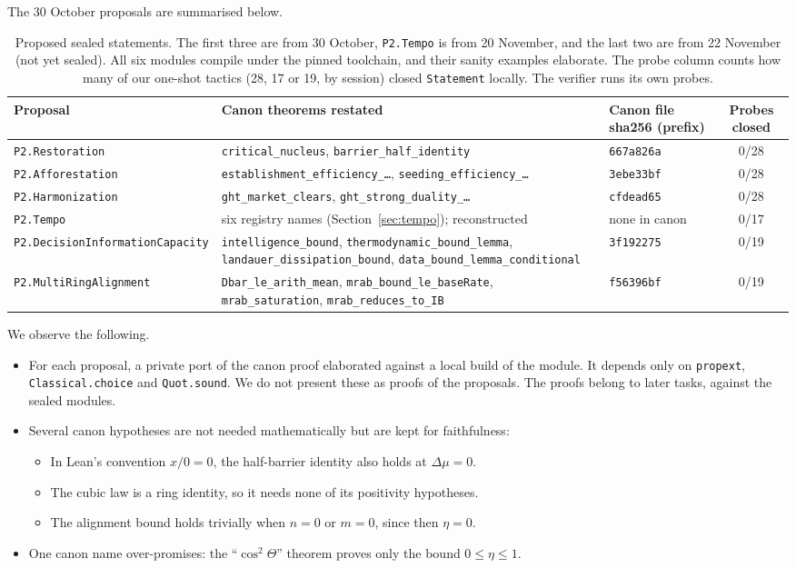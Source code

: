 \documentclass[11pt]{article}
\theoremstyle{definition}
\theoremstyle{remark}
\begin{document}
The 30 October proposals are summarised below.
\begin{table}[h]
\centering\small
\begin{tabular}{@{}p{}p{}lc@{}}
\toprule
Proposal & Canon theorems restated & Canon file sha256 (prefix) & Probes closed \\
\midrule
\texttt{P2.Restoration} & \texttt{critical\_nucleus}, \texttt{barrier\_half\_identity} & \texttt{667a826a} & 0/28 \\
\texttt{P2.Afforestation} & \texttt{establishment\_efficiency\_\ldots}, \texttt{seeding\_efficiency\_\ldots} & \texttt{3ebe33bf} & 0/28 \\
\texttt{P2.Harmonization} & \texttt{ght\_market\_clears}, \texttt{ght\_strong\_duality\_\ldots} & \texttt{cfdead65} & 0/28 \\
\texttt{P2.Tempo} & six registry names (Section~\ref{sec:tempo}); reconstructed & none in canon & 0/17 \\
\texttt{P2.Decision}\allowbreak\texttt{Information}\allowbreak\texttt{Capacity} & \texttt{intelligence\_bound}, \texttt{thermodynamic\_bound\_lemma}, \texttt{landauer\_dissipation\_bound}, \texttt{data\_bound\_lemma\_conditional} & \texttt{3f192275} & 0/19 \\
\texttt{P2.MultiRing}\allowbreak\texttt{Alignment} & \texttt{Dbar\_le\_arith\_mean}, \texttt{mrab\_bound\_le\_baseRate}, \texttt{mrab\_saturation}, \texttt{mrab\_reduces\_to\_IB} & \texttt{f56396bf} & 0/19 \\
\bottomrule
\end{tabular}
\caption{Proposed sealed statements. The first three are from 30 October, \texttt{P2.Tempo} is from 20 November, and the last two are from 22 November (not yet sealed). All six modules compile under the pinned toolchain, and their sanity examples elaborate.
The probe column counts how many of our one-shot tactics (28, 17 or 19, by session) closed \texttt{Statement} locally. The verifier runs its own probes.}
\end{table}
We observe the following.
\begin{itemize}
\item For each proposal, a private port of the canon proof elaborated against a local build of the module.
It depends only on \texttt{propext}, \texttt{Classical.choice} and \texttt{Quot.sound}.
We do not present these as proofs of the proposals. The proofs belong to later tasks, against the sealed modules.
\item Several canon hypotheses are not needed mathematically but are kept for faithfulness:
\begin{itemize}
\item In Lean's convention $x/0=0$, the half-barrier identity also holds at $\Delta\mu=0$.
\item The cubic law is a ring identity, so it needs none of its positivity hypotheses.
\item The alignment bound holds trivially when $n=0$ or $m=0$, since then $\eta=0$.
\end{itemize}
\item One canon name over-promises: the ``$\cos^2\Theta$'' theorem proves only the bound $0\le\eta\le1$.
\end{itemize}
\end{document}
